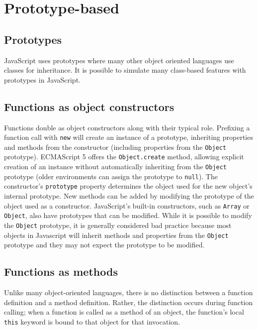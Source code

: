 \section{Prototype-based}



\subsection{Prototypes}

JavaScript uses prototypes where many other object oriented languages use classes for inheritance. It is possible to simulate many class-based features with prototypes in JavaScript.


\subsection{Functions as object constructors}


Functions double as object constructors along with their typical role. Prefixing a function call with \texttt{new} will create an instance of a prototype, inheriting properties and methods from the constructor (including properties from the \texttt{Object} prototype). ECMAScript 5 offers the \texttt{Object.create} method, allowing explicit creation of an instance without automatically inheriting from the \texttt{Object} prototype (older environments can assign the prototype to \texttt{null}). The constructor's \texttt{prototype} property determines the object used for the new object's internal prototype. New methods can be added by modifying the prototype of the object used as a constructor. JavaScript's built-in constructors, such as \texttt{Array} or \texttt{Object}, also have prototypes that can be modified. While it is possible to modify the \texttt{Object} prototype, it is generally considered bad practice because most objects in Javascript will inherit methods and properties from the \texttt{Object} prototype and they may not expect the prototype to be modified.


\subsection{Functions as methods}

Unlike many object-oriented languages, there is no distinction between a function definition and a method definition. Rather, the distinction occurs during function calling; when a function is called as a method of an object, the function's local \texttt{this} keyword is bound to that object for that invocation.



